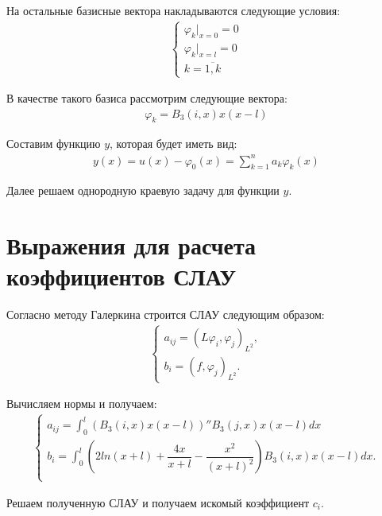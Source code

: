 \documentclass[12pt,a4paper,oneside]{extarticle}
\begin{document}
    На остальные базисные вектора накладываются следующие условия:
    \begin{gather}
        \begin{cases}
            \varphi_k|_{x = 0} = 0 \nonumber \\
            \varphi_k|_{x = l} = 0 \nonumber \\
            k = \overline{1, k} \nonumber
        \end{cases}
    \end{gather}
    
    В качестве такого базиса рассмотрим следующие вектора:
    \begin{gather}
        \varphi_k = B_{3}(i,x) x (x-l) \nonumber
    \end{gather}
    
    Составим функцию $y$, которая будет иметь вид: 
    \begin{gather}
        y(x) = u(x) - \varphi_0(x) = \sum\limits_{k=1}^{n} a_k\varphi_k(x) \nonumber
    \end{gather}

    Далее решаем однородную краевую задачу для функции $y$.

\section{Выражения для расчета коэффициентов СЛАУ}
    Согласно методу Галеркина строится СЛАУ следующим образом:
    \begin{gather}
        \begin{cases}
            a_{ij} = (L\varphi_i,\varphi_j)_{L^2}, \nonumber \\
            b_i = (f,\varphi_j)_{L^2}.
        \end{cases}
    \end{gather}

    Вычисляем нормы и получаем:
    \begin{gather}
        \begin{cases}
            a_{ij} =  \int_0^l (B_{3}(i,x) x(x-l))''  B_{3}(j,x) x(x-l) dx \nonumber \\
            b_i = \int_0^l (2ln(x+l) + \dfrac{4x}{x+l} - \dfrac{x^2}{(x+l)^2}) B_{3}(i,x) x(x-l) dx.  \nonumber \\
        \end{cases}
    \end{gather}
    
    Решаем полученную СЛАУ и получаем искомый коэффициент $c_i$.
\end{document}
